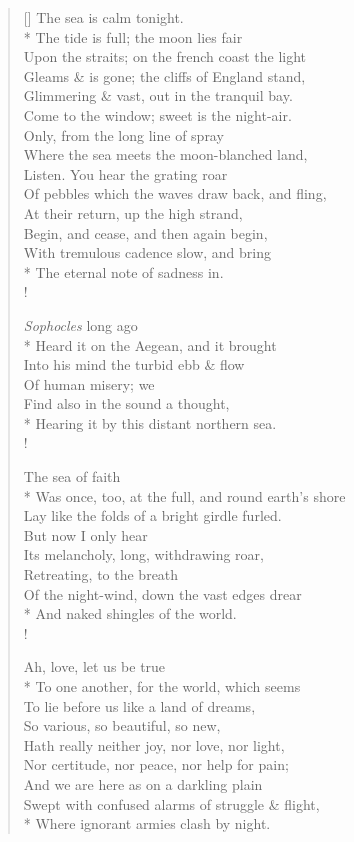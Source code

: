 \documentclass[MAIN]{subfiles}
\begin{document}
\settowidth{\versewidth}{Of pebbles which the waves draw back, and fling,}
\begin{verse}[\versewidth]
The sea is calm tonight.\\*
The tide is full; the moon lies fair\\
Upon the straits; on the french coast the light\\
Gleams \& is gone; the cliffs of England stand,\\
Glimmering \& vast, out in the tranquil bay.\\
Come to the window; sweet is the night-air.\\
Only, from the long line of spray\\
Where the sea meets the moon-blanched land,\\
Listen. You hear the grating roar\\
Of pebbles which the waves draw back, and fling,\\
At their return, up the high strand,\\
Begin, and cease, and then again begin,\\
With tremulous cadence slow, and bring\\*
The eternal note of sadness in.\\!

\emph{Sophocles} long ago\\*
Heard it on the Aegean, and it brought\\
Into his mind the turbid ebb \& flow\\
Of human misery; we\\
Find also in the sound a thought,\\*
Hearing it by this distant northern sea.\\!

The sea of faith\\*
Was once, too, at the full, and round earth's shore\\
Lay like the folds of a bright girdle furled.\\
But now I only hear\\
Its melancholy, long, withdrawing roar,\\
Retreating, to the breath\\
Of the night-wind, down the vast edges drear\\*
And naked shingles of the world.\\!

Ah, love, let us be true\\*
To one another, for the world, which seems\\
To lie before us like a land of dreams,\\
So various, so beautiful, so new,\\
Hath really neither joy, nor love, nor light,\\
Nor certitude, nor peace, nor help for pain;\\
And we are here as on a darkling plain\\
Swept with confused alarms of struggle \& flight,\\*
Where ignorant armies clash by night.
\end{verse}
\end{document}
